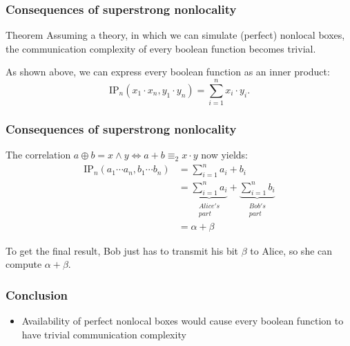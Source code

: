 \documentclass{beamer}
\begin{document}
\begin{frame}\frametitle{Consequences of superstrong nonlocality}
  \begin{block}{Theorem}
    Assuming a theory, in which we can simulate (perfect) nonlocal boxes,
    the communication complexity of every boolean function becomes trivial.
  \end{block}
  
  As shown above, we can express every boolean function as an inner product:
  $$\text{IP}_n(x_1 \cdot x_n, y_1 \cdot y_n) = \sum\limits_{i = 1}^{n}{x_i \cdot y_i} \text{.}$$
\end{frame}

\begin{frame}\frametitle{Consequences of superstrong nonlocality}
  The correlation $a \oplus b = x \land y \iff a + b \equiv_2 x \cdot y$ now yields:
  \begin{align*}
    \text{IP}_n(a_1 \cdots a_n, b_1 \cdots b_n) &= \sum\limits_{i = 1}^{n}{a_i + b_i} \\
                                                &= \underbrace{\sum\limits_{i = 1}^{n}{a_i}}_{\substack{Alice's \\ part}} +
                                                   \underbrace{\sum\limits_{i = 1}^{n}{b_i}}_{\substack{Bob's \\ part}} \\
                                                &= \alpha + \beta
  \end{align*}
  
  To get the final result, Bob just has to transmit his bit $\beta$ to
  Alice, so she can compute $\alpha + \beta$.
\end{frame}

\begin{frame}\frametitle{Conclusion}
  \begin{itemize}
  	\item Availability of perfect nonlocal boxes would cause every boolean function to
  	      have trivial communication complexity
  \end{itemize}
\end{frame}
\end{document}

